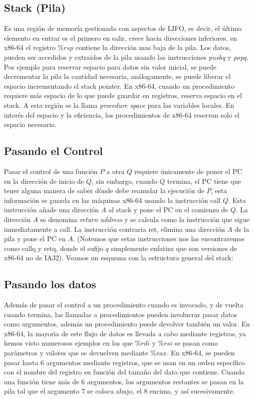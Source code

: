 \subsection{Stack (Pila)}
Es una región de memoría gestionada con aspectos de LIFO, es decir, el último elemento en entrar es el primero en salir, crece hacia direcciones inferiores, en x86-64
el registro $\%rsp$ contiene la dirección mas baja de la pila. Los datos, pueden ser accedidos y extraidos de la pila usando las instrucciones \textit{pushq} y \textit{popq}.
Por ejemplo para reservar espacio para datos sin valor inicial, se puede decrementar la pila la cantidad necesaria, análogamente, se puede liberar el espacio incrementando el stack pointer.
En x86-64, cuando un procedimiento requiere más espacio de lo que puede guardar en registros, reserva espacio en el stack. A esta región se la llama \textit{procedure space} para las variables locales.
En interés del espacio y la eficiencia, los procedimientos de x86-64 reservan solo el espacio necesario.

\subsection{Pasando el Control}
Pasar el control de una función $P$ a otra $Q$ requiere únicamente de poner el PC en la dirección de inicio de $Q$,
sin embargo, cuando $Q$ termina, el PC tiene que tener alguna manera de saber dónde debe reanudar la ejecución de $P$, esta información se guarda en las máquinas
x86-64 usando la instrucción call $Q$. Esta instrucción añade una dirección $A$ al stack y pone el PC en el comienzo de $Q$. La dirección $A$ se denomina \textit{return address} y se calcula como
la instrucción que sigue inmediatamente a call. La instrucción contraria ret, elimina una dirección $A$ de la pila y pone el PC en $A$.
(Notemos que estas instrucciones nos las encontraremos como callq y retq, donde el sufijo $q$ simplemente enfatiza que son versiones de x86-64 no de IA32).
Veamos un esquema con la estructura general del stack:


\begin{center}
	
	\label {fig:stack}
\end{center}
\subsection{Pasando los datos}
Además de pasar el control a un procedimiento cuando es invocado, y de vuelta cuando termina, las llamadas a procedimientos
pueden involucrar pasar datos como argumentos, además un procedimiento puede devolver también un valor. En x86-64, la mayoria de
este flujo de datos es llevada a cabo mediante registros, ya hemos visto numerosos ejemplos en los que $\%rdi$ y $\%rsi$ se pasan como
parámetros y valores que se devuelven mediante $\%rax$. En x86-64, se pueden pasar hasta 6 argumentos mediante registros, que se usan en un orden
específico con el nombre del registro en función del tamaño del dato que contiene.
Cuando una función tiene más de 6 argumentos, los argumentos restantes se pasan en la pila tal que el argumento 7 se coloca abajo, el 8 encima, y así sucesivamente.
